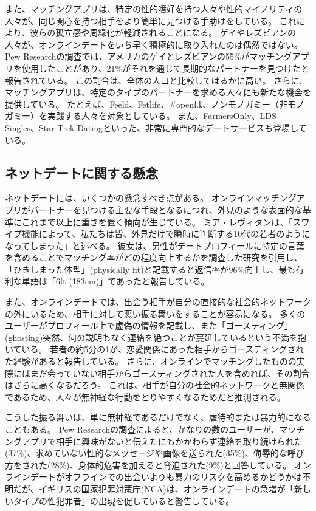 \documentclass[paper=a4,book,openany]{jlreq} \usepackage{mystyle}
\begin{document}
また、マッチングアプリは、特定の性的嗜好を持つ人々や性的マイノリティの人々が、同じ関心を持つ相手をより簡単に見つける手助けをしている。
これにより、彼らの孤立感や周縁化が軽減されることになる。
ゲイやレズビアンの人々が、オンラインデートをいち早く積極的に取り入れたのは偶然ではない。
Pew Researchの調査では、アメリカのゲイとレズビアンの55\%がマッチングアプリを使用したことがあり、21\%がそれを通じて長期的なパートナーを見つけたと報告されている。
この割合は、全体の人口と比較してはるかに高い。
さらに、マッチングアプリは、特定のタイプのパートナーを求める人々にも新たな機会を提供している。
たとえば、Feeld、Fetlife、\#openは、ノンモノガミー（非モノガミー）を実践する人々を対象としている。
また、FarmersOnly、LDS Singles、Star Trek Datingといった、非常に専門的なデートサービスも登場している。

\subsection{ネットデートに関する懸念}

ネットデートには、いくつかの懸念すべき点がある。
オンラインマッチングアプリがパートナーを見つける主要な手段となるにつれ、外見のような表面的な基準にこれまで以上に重きを置く傾向が生じている。
ミア・レヴィタンは、「スワイプ機能によって、私たちは皆、外見だけで瞬時に判断する10代の若者のようになってしまった」と述べる。
彼女は、男性がデートプロフィールに特定の言葉を含めることでマッチング率がどの程度向上するかを調査した研究を引用し、「ひきしまった体型」(physically fit)と記載すると返信率が96\%向上し、最も有利な単語は「6ft (183cm)」であったと報告している\citep{levitan20:_futur_seduc_lond,dodgson18:_usin_thes_word}。

また、オンラインデートでは、出会う相手が自分の直接的な社会的ネットワークの外にいるため、相手に対して悪い振る舞いをすることが容易になる。
多くのユーザーがプロフィール上で虚偽の情報を記載し、また「ゴースティング」(ghosting){\DDASH}突然、何の説明もなく連絡を絶つこと{\DDASH}が蔓延しているという不満を抱いている。
若者の約5分の1が、恋愛関係にあった相手からゴースティングされた経験があると報告している\citep{yougov14:_poll_resul,navarro20:_psyc_corr_ghos_bread_exper}。
さらに、オンラインでマッチングしたものの実際にはまだ会っていない相手からゴースティングされた人を含めれば、その割合はさらに高くなるだろう。
これは、相手が自分の社会的ネットワークと無関係であるため、人々が無神経な行動をとりやすくなるためだと推測される。

こうした振る舞いは、単に無神経であるだけでなく、虐待的または暴力的になることもある。
Pew Researchの調査によると、かなりの数のユーザーが、マッチングアプリで相手に興味がないと伝えたにもかかわらず連絡を取り続けられた(37\%)、求めていない性的なメッセージや画像を送られた(35\%)、侮辱的な呼び方をされた(28\%)、身体的危害を加えると脅迫された(9\%)と回答している\citep{anderson20:_virt_down_onlin_datin}。
オンラインデートがオフラインでの出会いよりも暴力のリスクを高めるかどうかは不明だが、イギリスの国家犯罪対策庁(NCA)は、オンラインデートの急増が「新しいタイプの性犯罪者」の出現を促していると警告している\citep{doria20:_are_datin_apps_safe_unsaf}。
\end{document}
